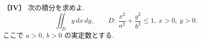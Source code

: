 \noindent\textbf{〔IV〕}
次の積分を求めよ.
\[
\iint_D y\,dx\,dy,\qquad
D:\ \frac{x^2}{a^2}+\frac{y^2}{b^2}\le 1,\ x>0,\ y>0.
\]
ここで $a>0,\ b>0$ の実定数とする.
